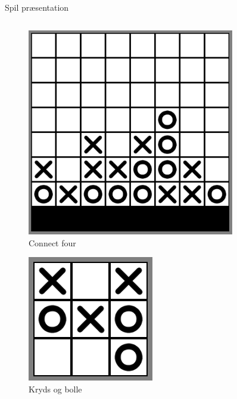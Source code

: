 \begin{frame}{Spil præsentation}
\begin{columns}
	\begin{column}{.49\textwidth}
	\centering
		\begin{figure}[H]
   			\includegraphics[scale=0.18]{billeder/connect4.png}
   			\caption{Connect four}
		\end{figure}
	\hspace{0.3cm}
	\centering
		\begin{figure}[H]
   			\includegraphics[scale=0.28]{billeder/noughtncrosses.png}
   			\caption{Kryds og bolle}
		\end{figure}
	\end{column}
	\hfill
	\begin{column}{.49\textwidth}
		\begin{figure}[H]

\end{figure}
\end{column}
\end{columns}
\end{frame}
